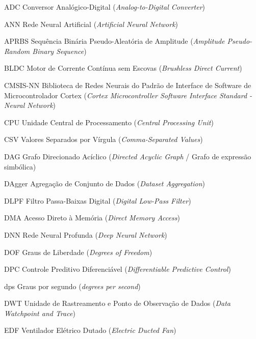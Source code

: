\listoftables*
\cleardoublepage


\begin{siglas}
    \item[ADC] Conversor Analógico-Digital (\textit{Analog-to-Digital Converter})
    \item[ANN] Rede Neural Artificial (\textit{Artificial Neural Network})
    \item[APRBS] Sequência Binária Pseudo-Aleatória de Amplitude (\textit{Amplitude Pseudo-Random Binary Sequence})
    \item[BLDC] Motor de Corrente Contínua sem Escovas (\textit{Brushless Direct Current})
    \item[CMSIS-NN] Biblioteca de Redes Neurais do Padrão de Interface de Software de Microcontrolador Cortex (\textit{Cortex Microcontroller Software Interface Standard - Neural Network})
    \item[CPU] Unidade Central de Processamento (\textit{Central Processing Unit})
    \item[CSV] Valores Separados por Vírgula (\textit{Comma-Separated Values})
    \item[DAG] Grafo Direcionado Acíclico (\textit{Directed Acyclic Graph} / Grafo de expressão simbólica)
    \item[DAgger] Agregação de Conjunto de Dados (\textit{Dataset Aggregation})
    \item[DLPF] Filtro Passa-Baixas Digital (\textit{Digital Low-Pass Filter})
    \item[DMA] Acesso Direto à Memória (\textit{Direct Memory Access})
    \item[DNN] Rede Neural Profunda (\textit{Deep Neural Network})
    \item[DOF] Graus de Liberdade (\textit{Degrees of Freedom})
    \item[DPC] Controle Preditivo Diferenciável (\textit{Differentiable Predictive Control})
    \item[dps] Graus por segundo (\textit{degrees per second})
    \item[DWT] Unidade de Rastreamento e Ponto de Observação de Dados (\textit{Data Watchpoint and Trace})
    \item[EDF] Ventilador Elétrico Dutado (\textit{Electric Ducted Fan})

\end{siglas}
